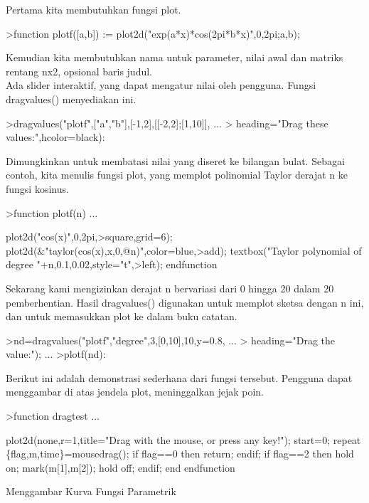 \documentclass[a4paper,10pt]{article}
\begin{document}
\begin{eulernotebook}
\begin{eulercomment}
\begin{eulercomment}
\begin{eulercomment}
Pertama kita membutuhkan fungsi plot.
\end{eulercomment}
\begin{eulerprompt}
>function plotf([a,b]) := plot2d("exp(a*x)*cos(2pi*b*x)",0,2pi;a,b);
\end{eulerprompt}
\begin{eulercomment}
Kemudian kita membutuhkan nama untuk parameter, nilai awal dan matriks
rentang nx2, opsional baris judul.\\
Ada slider interaktif, yang dapat mengatur nilai oleh pengguna. Fungsi
dragvalues() menyediakan ini.
\end{eulercomment}
\begin{eulerprompt}
>dragvalues("plotf",["a","b"],[-1,2],[[-2,2];[1,10]], ...
>  heading="Drag these values:",hcolor=black):
\end{eulerprompt}
\begin{eulercomment}
Dimungkinkan untuk membatasi nilai yang diseret ke bilangan bulat.
Sebagai contoh, kita menulis fungsi plot, yang memplot polinomial
Taylor derajat n ke fungsi kosinus.
\end{eulercomment}
\begin{eulerprompt}
>function plotf(n) ...
\end{eulerprompt}
\begin{eulerudf}
  plot2d("cos(x)",0,2pi,>square,grid=6);
  plot2d(&"taylor(cos(x),x,0,@n)",color=blue,>add);
  textbox("Taylor polynomial of degree "+n,0.1,0.02,style="t",>left);
  endfunction
\end{eulerudf}
\begin{eulercomment}
Sekarang kami mengizinkan derajat n bervariasi dari 0 hingga 20 dalam
20 pemberhentian. Hasil dragvalues() digunakan untuk memplot sketsa
dengan n ini, dan untuk memasukkan plot ke dalam buku catatan.
\end{eulercomment}
\begin{eulerprompt}
>nd=dragvalues("plotf","degree",3,[0,10],10,y=0.8, ...
>   heading="Drag the value:"); ...
>plotf(nd):
\end{eulerprompt}
\begin{eulercomment}
Berikut ini adalah demonstrasi sederhana dari fungsi tersebut.
Pengguna dapat menggambar di atas jendela plot, meninggalkan jejak
poin.
\end{eulercomment}
\begin{eulerprompt}
>function dragtest ...
\end{eulerprompt}
\begin{eulerudf}
    plot2d(none,r=1,title="Drag with the mouse, or press any key!");
    start=0;
    repeat
      \{flag,m,time\}=mousedrag();
      if flag==0 then return; endif;
      if flag==2 then
        hold on; mark(m[1],m[2]); hold off;
      endif;
    end
  endfunction
\end{eulerudf}
\begin{eulercomment}
Menggambar Kurva Fungsi Parametrik 



\end{eulercomment}
\end{eulercomment}
\end{eulercomment}
\end{eulernotebook}
\end{document}
